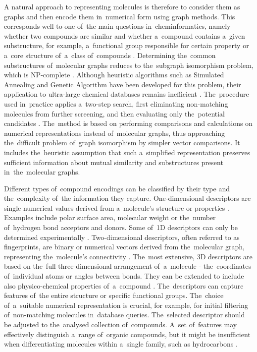 A natural approach to representing molecules is therefore to consider them as graphs and then encode them in~numerical form using graph methods. This corresponds well to one of~the main questions in~cheminformatics, namely whether two compounds are similar and whether a~compound contains a~given substructure, for example, a~functional group responsible for certain property or a~core structure of~a~class of~compounds \cite{karthikeyan2014chemoinformatics}. Determining the~common substructures of~molecular graphs reduces to the~subgraph isomorphism problem, which is NP-complete \cite{garey1990intractability}. Although heuristic algorithms such as Simulated Annealing and Genetic Algorithm have been developed for this problem, their application to ultra-large chemical databases remains inefficient \cite{leach2007chemoinformatics, li2016heuristics}. The~procedure used in~practice applies a~two-step search, first eliminating non-matching molecules from further screening, and then evaluating only the~potential candidates \cite{leach2007chemoinformatics}. The~method is based on performing comparisons and calculations on numerical representations instead of~molecular graphs, thus approaching the~difficult problem of~graph isomorphism by simpler vector comparisons. It includes the~heuristic assumption that such a~simplified representation preserves sufficient information about mutual similarity and substructures present in~the~molecular graphs.

Different types of~compound encodings can be classified by their type and the~complexity of~the information they capture. One-dimensional descriptors are single numerical values derived from a~molecule’s structure or properties \cite{leach2007chemoinformatics}. Examples include polar surface area, molecular weight or the~number of~hydrogen bond acceptors and donors. Some of~1D descriptors can only be determined experimentally \cite{brown2015medicinal}. Two-dimensional descriptors, often referred to as fingerprints, are binary or numerical vectors derived from the~molecular graph, representing the~molecule’s connectivity \cite{leach2007chemoinformatics}. The~most extensive, 3D descriptors are based on the~full three-dimensional arrangement of~a~molecule - the~coordinates of~individual atoms or angles between bonds. They can be extended to include also physico-chemical properties of~a~compound \cite{gasteiger2003chemoinformatics}. The~descriptors can capture features of~the entire structure or specific functional groups. The~choice of~a~suitable numerical representation is crucial, for example, for initial filtering of~non-matching molecules in~database queries. The~selected descriptor should be adjusted to the~analysed collection of~compounds. A~set of~features may effectively distinguish a~range of~organic compounds, but it might be insufficient when differentiating molecules within a~single family, such as hydrocarbons \cite{leach2007chemoinformatics}.

